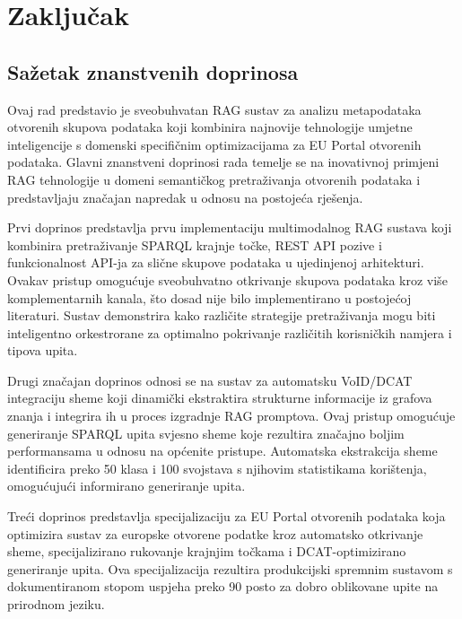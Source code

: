 \chapter{Zaključak}
\label{ch:conclusion}


\section{Sažetak znanstvenih doprinosa}
\label{sec:contributions}

Ovaj rad predstavio je sveobuhvatan RAG sustav za analizu metapodataka otvorenih skupova podataka koji kombinira najnovije tehnologije umjetne inteligencije s domenski specifičnim optimizacijama za EU Portal otvorenih podataka. Glavni znanstveni doprinosi rada temelje se na inovativnoj primjeni RAG tehnologije u domeni semantičkog pretraživanja otvorenih podataka i predstavljaju značajan napredak u odnosu na postojeća rješenja.

Prvi doprinos predstavlja prvu implementaciju multimodalnog RAG sustava koji kombinira pretraživanje SPARQL krajnje točke, REST API pozive i funkcionalnost API-ja za slične skupove podataka u ujedinjenoj arhitekturi. Ovakav pristup omogućuje sveobuhvatno otkrivanje skupova podataka kroz više komplementarnih kanala, što dosad nije bilo implementirano u postojećoj literaturi. Sustav demonstrira kako različite strategije pretraživanja mogu biti inteligentno orkestrorane za optimalno pokrivanje različitih korisničkih namjera i tipova upita.

Drugi značajan doprinos odnosi se na sustav za automatsku VoID/DCAT integraciju sheme koji dinamički ekstraktira strukturne informacije iz grafova znanja i integrira ih u proces izgradnje RAG promptova. Ovaj pristup omogućuje generiranje SPARQL upita svjesno sheme koje rezultira značajno boljim performansama u odnosu na općenite pristupe. Automatska ekstrakcija sheme identificira preko 50 klasa i 100 svojstava s njihovim statistikama korištenja, omogućujući informirano generiranje upita.

Treći doprinos predstavlja specijalizaciju za EU Portal otvorenih podataka koja optimizira sustav za europske otvorene podatke kroz automatsko otkrivanje sheme, specijalizirano rukovanje krajnjim točkama i DCAT-optimizirano generiranje upita. Ova specijalizacija rezultira produkcijski spremnim sustavom s dokumentiranom stopom uspjeha preko 90 posto za dobro oblikovane upite na prirodnom jeziku.

